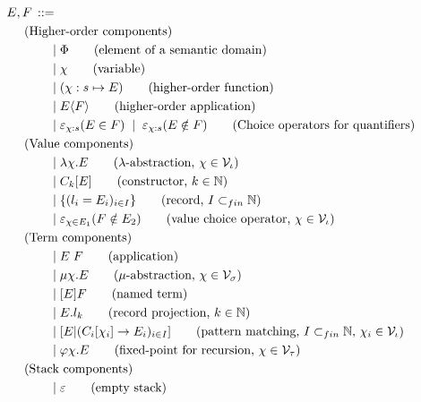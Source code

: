 \begin{figure}
  \begin{align*}
    E,F \bnfeq&\\
    &\hspace{-1cm}\text{(Higher-order components)}\\
    \bnfor &\Phi                   \tag{element of a semantic domain}\\
    \bnfor &\chi                   \tag{variable}\\
    \bnfor &(\chi:s \mapsto E)     \tag{higher-order function}\\
    \bnfor &E\langle F \rangle     \tag{higher-order application}\\
    \bnfor &\varepsilon_{\chi:s}(E \in F) \bnfor
      \varepsilon_{\chi:s}(E \notin F)
      \tag{Choice operators for quantifiers}\\
    &\hspace{-1cm}\text{(Value components)}\\
    \bnfor &\lambda \chi.E
      \tag{$\lambda$-abstraction, $\chi \in \mathcal{V}_\iota$}\\
    \bnfor &C_k[E]                 \tag{constructor, $k \in \mathbb{N}$}\\
    \bnfor &\{(l_i=E_i)_{i \in I}\}\tag{record, $I \subset_{fin} \mathbb{N}$}\\
    \bnfor &\varepsilon_{\chi \in E_1}(F \notin E_2)
      \tag{value choice operator, $\chi \in \mathcal{V}_\iota$}\\
    &\hspace{-1cm}\text{(Term components)}\\
    \bnfor &E\;F                   \tag{application}\\
    \bnfor &\mu\chi.E
      \tag{$\mu$-abstraction, $\chi \in \mathcal{V}_\sigma$}\\
    \bnfor &[E]F                   \tag{named term}\\
    \bnfor &E.l_k                  \tag{record projection, $k \in \mathbb{N}$}\\
    \bnfor &[E|(C_i[\chi_i] \to E_i)_{i \in I}]
      \tag{pattern matching, $I \subset_{fin} \mathbb{N}$, $\chi_i \in
      \mathcal{V}_\iota$}\\
    \bnfor &\varphi \chi.E
      \tag{fixed-point for recursion, $\chi \in \mathcal{V}_\tau$}\\
    &\hspace{-1cm}\text{(Stack components)}\\
    \bnfor &\varepsilon            \tag{empty stack}\\

\end{align*}
\end{figure}
